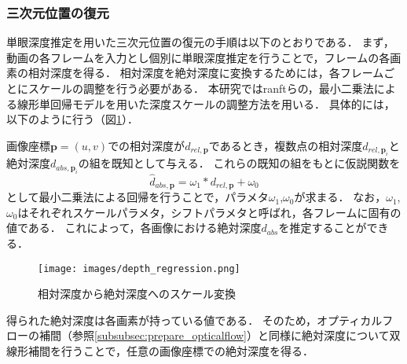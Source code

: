 \subsubsection*{三次元位置の復元}
単眼深度推定を用いた三次元位置の復元の手順は以下のとおりである．
まず，動画の各フレームを入力とし個別に単眼深度推定を行うことで，フレームの各画素の相対深度を得る．
相対深度を絶対深度に変換するためには，各フレームごとにスケールの調整を行う必要がある．
本研究ではranftら\cite{ranftl2020towards}の，最小二乗法による線形単回帰モデルを用いた深度スケールの調整方法を用いる．
具体的には，以下のように行う（図\ref{fig:depth_regression}）．

画像座標$\mathbf{p}=(u,v)$での相対深度が$d_{rel,\mathbf{p}}$であるとき，複数点の相対深度$d_{rel,\mathbf{p}_i}$と絶対深度$d_{abs,\mathbf{p}_i}$の組を既知として与える．
これらの既知の組をもとに仮説関数を
\begin{equation}\label{eq:regression}
	\hat{d}_{abs,\mathbf{p}}=\omega_1*d_{rel,\mathbf{p}}+\omega_0
\end{equation}
として最小二乗法による回帰を行うことで，パラメタ$\omega_1$,$\omega_0$が求まる．
なお，$\omega_1$,$\omega_0$はそれぞれスケールパラメタ，シフトパラメタと呼ばれ，各フレームに固有の値である．
これによって，各画像における絶対深度$d_{abs}$を推定することができる．

\begin{figure}[h]
	\centering
	\texttt{[image: images/depth\_regression.png]}
	\caption{相対深度から絶対深度へのスケール変換}
	\label{fig:depth_regression}
\end{figure}

得られた絶対深度は各画素が持っている値である．
そのため，オプティカルフローの補間（参照\ref{subsubsec:prepare_opticalflow}）と同様に絶対深度について双線形補間を行うことで，任意の画像座標での絶対深度を得る．

